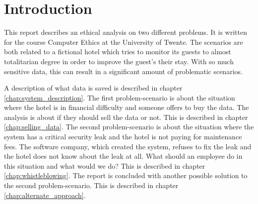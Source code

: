 \chapter{Introduction}

This report describes an ethical analysis on two different problems. It is written for the course Computer Ethics at the University of Twente. The scenarios are both related to a fictional hotel which tries to monitor its guests to almost totalitarian degree in order to improve the guest's their stay. With so much sensitive data, this can result in a significant amount of problematic scenarios.

A description of what data is saved is described in chapter \ref{chap:system_description}. The first problem-scenario is about the situation where the hotel is in financial difficulty and someone offers to buy the data. The analysis is about if they should sell the data or not. This is described in chapter \ref{chap:selling_data}. The second problem-scenario is about the situation where the system has a critical security leak and the hotel is not paying for maintenance fees. The software company, which created the system, refuses to fix the leak and the hotel does not know about the leak at all. What should an employee do in this situation and what would we do? This is described in chapter \ref{chap:whistleblowing}. The report is concluded with another possible solution to the second problem-scenario. This is described in chapter \ref{chap:alternate_approach}.